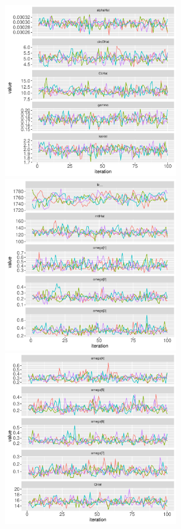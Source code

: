 \documentclass[11pt]{amsart}
\begin{document}
\begin{figure}[htbp]
\includegraphics[width=3.0in,trim=0in 0in 0 0in]{graphics/neutropenia/neutropeniaPopulation1TorstenPlots001.pdf}
\includegraphics[width=3.0in,trim=0in 0in 0 0in]{graphics/neutropenia/neutropeniaPopulation1TorstenPlots002.pdf}
\includegraphics[width=3.0in,trim=0in 0in 0 0in]{graphics/neutropenia/neutropeniaPopulation1TorstenPlots003.pdf}

\end{figure}
\end{document}
